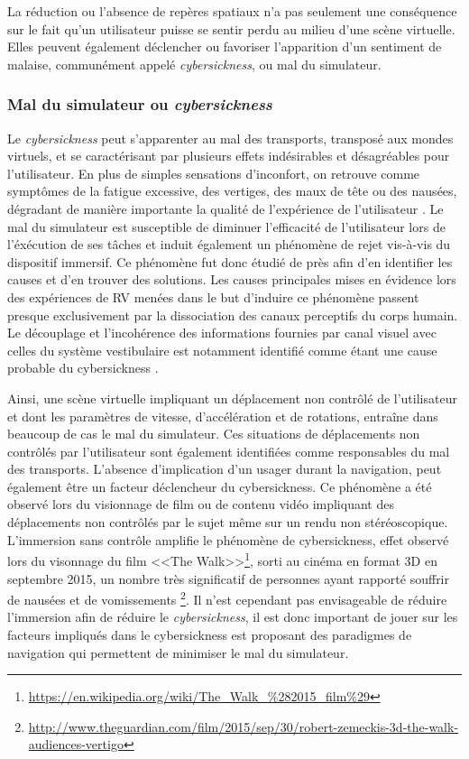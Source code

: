 La réduction ou l'absence de repères spatiaux n'a pas seulement une conséquence sur le fait qu'un utilisateur puisse se sentir perdu au milieu d'une scène virtuelle. Elles peuvent également déclencher ou favoriser l'apparition d'un sentiment de malaise, communément appelé \textit{cybersickness}, ou mal du simulateur. 

\subsubsection{Mal du simulateur ou \textit{cybersickness}} \label{cybersickness}

Le \textit{cybersickness} peut s'apparenter au mal des transports, transposé aux mondes virtuels, et se caractérisant par plusieurs effets indésirables et désagréables pour l'utilisateur. En plus de simples sensations d'inconfort, on retrouve comme symptômes de la fatigue excessive, des vertiges, des maux de tête ou des nausées, dégradant de manière importante la qualité de l'expérience de l'utilisateur \cite{kolasinski1995simulator,laviola_jr_discussion_2000}. Le mal du simulateur est susceptible de diminuer l'efficacité de l'utilisateur lors de l'éxécution de ses tâches et induit également un phénomène de rejet vis-à-vis du dispositif immersif. Ce phénomène fut donc étudié de près afin d'en identifier les causes et d'en trouver des solutions. Les causes principales mises en évidence lors des expériences de RV menées dans le but d'induire ce phénomène passent presque exclusivement par la dissociation des canaux perceptifs du corps humain. Le découplage et l'incohérence des informations fournies par canal visuel avec celles du système vestibulaire  est notamment identifié comme étant une cause probable du cybersickness \cite{reason1975motion}. 

Ainsi, une scène virtuelle impliquant un déplacement non contrôlé de l'utilisateur et dont les paramètres de vitesse, d'accélération et de rotations, entraîne dans beaucoup de cas le mal du simulateur. Ces situations de déplacements non contrôlés par l'utilisateur sont également identifiées comme responsables du mal des transports. L'absence d'implication d'un usager durant la navigation, peut également être un facteur déclencheur du cybersickness. Ce phénomène a été observé lors du visionnage de film ou de contenu vidéo impliquant des  déplacements non contrôlés par le sujet même sur un rendu non stéréoscopique. L'immersion sans contrôle amplifie le phénomène de cybersickness, effet observé lors du visonnage du film <<The Walk>>\footnote{\url{https://en.wikipedia.org/wiki/The\_Walk\_\%282015\_film\%29}}, sorti au cinéma en format 3D en septembre 2015, un nombre très significatif de personnes ayant rapporté souffrir de nausées et de vomissements \footnote{\url{http://www.theguardian.com/film/2015/sep/30/robert-zemeckis-3d-the-walk-audiences-vertigo}}. Il n'est cependant pas envisageable de réduire l'immersion afin de réduire le \textit{cybersickness}, il est donc important de jouer sur les facteurs impliqués dans le cybersickness est proposant des paradigmes de navigation qui permettent de minimiser le mal du simulateur.

